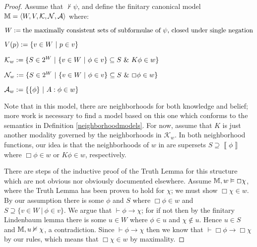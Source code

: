 \begin{proof}
  Assume that $\nvdash \psi$, and define the finitary canonical model
  $\mathbbm{M}= \langle W, V, \mathcal{K}, \mathcal{N}, \mathcal{A} \rangle$
  where:
  \begin{itemizedot}
    \item $W \assign \text{the maximally consistent sets of subformulae of
    $\psi$, closed under single negation}$
    
    \item $V (p) \assign \{v \in W \  | \  p \in v\}$
    
    \item $\mathcal{K}_w \assign \{S \in 2^W \  | \  \{v
    \in W \  | \  \phi \in v\} \subseteq S \  \&
    \  K \phi \in w\}$
    
    \item $\mathcal{N}_w \assign \{S \in 2^W \  | \  \{v
    \in W \  | \  \phi \in v\} \subseteq S \  \&
    \  \Box \phi \in w\}$
    
    \item $\mathcal{A}_w \assign \{\{\phi\} \  | \  A :
    \phi \in w\}$
  \end{itemizedot}
  Note that in this model, there are neighborhoods for both knowledge and
  belief; more work is necessary to find a model based on this one which
  conforms to the semantics in Definition \ref{neighborhoodmodels}.  For now,
  assume that $K$ is just another modality governed by the neighborhoods in
  $\mathcal{K}_w$.  In both neighborhood functions, our idea is that the
  neighborhoods of $w$ in are supersets $S \supseteq \left\llbracket \phi
  \right\rrbracket$ where $\Box \phi \in w$ or $K \phi \in w$, respectively.
  
  
  
  There are steps of the inductive proof of the Truth Lemma for this structure
  which are not obvious nor obviously documented elsewhere.  Assume
  $\mathbbm{M}, w \vDash \Box \chi$, where the Truth Lemma has been proven to
  hold for $\chi$; we must show $\Box \chi \in w$.  By our assumption there
  is some $\phi$ and $S$ where $\Box \phi \in w$ and $S \supseteq \{v \in W
  \  | \  \phi \in v\}$.  We argue that $\vdash \phi
  \rightarrow \chi$; for if not then by the finitary Lindenbaum lemma there is
  some $u \in W$ where $\phi \in u$ and $\chi \nin u$.  Hence $u \in S$ and
  $\mathbbm{M}, u \nvDash \chi$, a contradiction.  Since $\vdash \phi
  \rightarrow \chi$ then we know that $\vdash \Box \phi \rightarrow \Box \chi$
  by our rules, which means that $\Box \chi \in w$ by maximality.
  

\end{proof}
